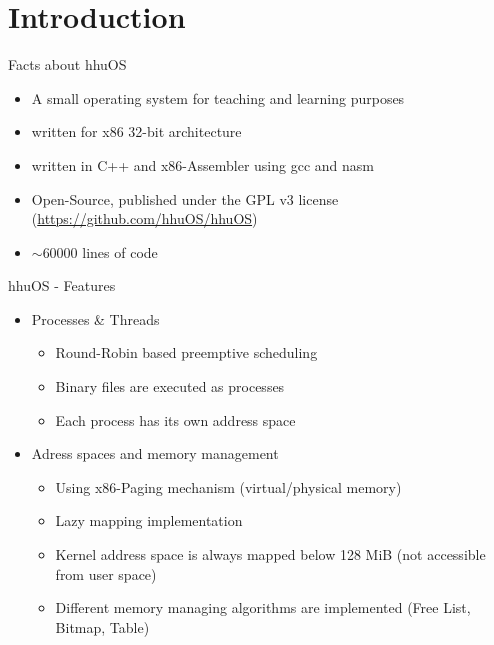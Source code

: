 \section{Introduction}
	
	\begin{frame}{Facts about hhuOS}
	\begin{itemize}
		\setlength\itemsep{1em}
		\item A small operating system for teaching and learning purposes
		\item written for x86 32-bit architecture
		\item written in C++ and x86-Assembler using gcc and nasm
		\item Open-Source, published under the GPL v3 license (\url{https://github.com/hhuOS/hhuOS})
		\item $\sim60000$ lines of code
	\end{itemize}
	\end{frame}
	
	\begin{frame}{hhuOS - Features}
		\begin{itemize}
			\item Processes \& Threads
			\begin{itemize}
				\item Round-Robin based preemptive scheduling
				\item Binary files are executed as processes
				\item Each process has its own address space
			\end{itemize}
			\vspace{1.0em}
			\item Adress spaces and memory management
			\begin{itemize}
				\item Using x86-Paging mechanism (virtual/physical memory)
				\item Lazy mapping implementation
				\item Kernel address space is always mapped below 128 MiB (not accessible from user space)
				\item Different memory managing algorithms are implemented (Free List, Bitmap, Table)
			\end{itemize}
		\end{itemize}
	\end{frame}

